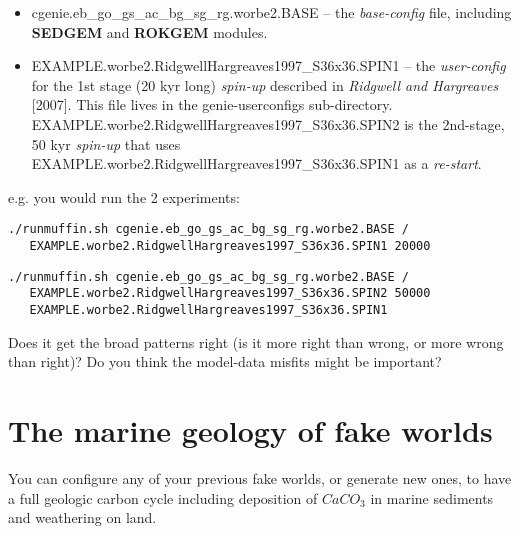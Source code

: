 \documentclass[11pt,fleqn]{book} %
\begin{document}
\begin{itemize}[noitemsep]
\vspace{1mm}
\item \textsf{\footnotesize cgenie.eb\_go\_gs\_ac\_bg\_sg\_rg.worbe2.BASE } -- the \textit{base-config} file, including \textbf{SEDGEM} and \textbf{ROKGEM} modules.
\vspace{1mm}
\item \textsf{\footnotesize EXAMPLE.worbe2.RidgwellHargreaves1997\_S36x36.SPIN1 } -- the \textit{user-config} for the 1st stage (20 kyr long) \textit{spin-up} described in  \textit{Ridgwell and Hargreaves} [2007]. This file lives in the \textsf{\footnotesize genie-userconfigs } sub-directory.
\\\textsf{\footnotesize EXAMPLE.worbe2.RidgwellHargreaves1997\_S36x36.SPIN2 } is the 2nd-stage, 50 kyr \textit{spin-up} that uses \textsf{\footnotesize EXAMPLE.worbe2.RidgwellHargreaves1997\_S36x36.SPIN1 } as a \textit{re-start}.
\end{itemize}
\vspace{1mm}
e.g. you would run the 2 experiments:
\vspace{-1mm}\small\begin{verbatim}
./runmuffin.sh cgenie.eb_go_gs_ac_bg_sg_rg.worbe2.BASE / 
   EXAMPLE.worbe2.RidgwellHargreaves1997_S36x36.SPIN1 20000
\end{verbatim}\normalsize\vspace{-2mm}
\vspace{-2mm}\small\begin{verbatim}
./runmuffin.sh cgenie.eb_go_gs_ac_bg_sg_rg.worbe2.BASE / 
   EXAMPLE.worbe2.RidgwellHargreaves1997_S36x36.SPIN2 50000 
   EXAMPLE.worbe2.RidgwellHargreaves1997_S36x36.SPIN1
\end{verbatim}\normalsize\vspace{-1mm}

Does it get the broad patterns right (is it more right than wrong, or more wrong than right)? Do you think the model-data misfits might be important?



\newpage


\section{The marine geology of fake worlds}

You can configure any of your previous fake worlds, or generate new ones, to have a full geologic carbon cycle including deposition of \(CaCO_{3}\) in marine sediments and weathering on land.
\end{document}
